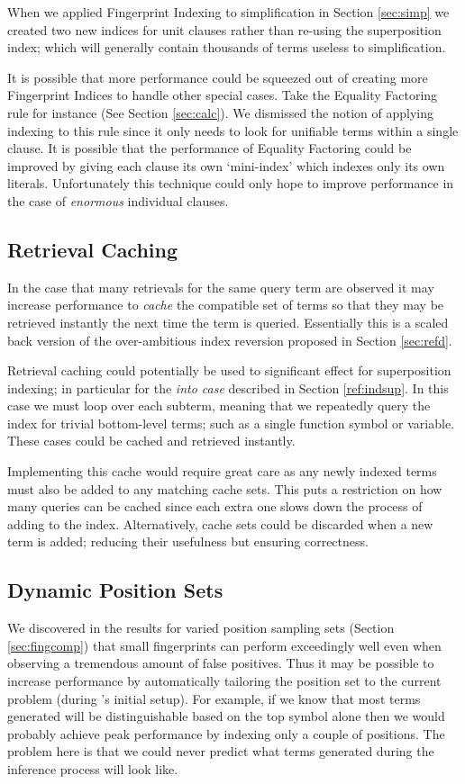 When we applied Fingerprint Indexing to simplification in Section \ref{sec:simp}
we created two new indices for unit clauses rather than re-using the superposition
index; which will generally contain thousands of terms useless to simplification.

It is possible that more performance could be squeezed out of creating more Fingerprint
Indices to handle other special cases. Take the Equality Factoring rule for instance
(See Section \ref{sec:calc}). We dismissed the notion of applying indexing to this rule
since it only needs to look for unifiable terms within a single clause. It is possible
that the performance of Equality Factoring could be improved by giving each clause
its own `mini-index' which indexes only its own literals. Unfortunately this technique
could only hope to improve performance in the case of \emph{enormous} individual clauses.

\subsection{Retrieval Caching}
In the case that many retrievals for the same query term are observed it may increase
performance to \emph{cache} the compatible set of terms so that they may be retrieved
instantly the next time the term is queried. Essentially this is a scaled back version
of the over-ambitious index reversion proposed in Section \ref{sec:refd}.

Retrieval caching could potentially be used to significant effect for superposition
indexing; in particular for the \emph{into case} described in Section \ref{ref:indsup}.
In this case we must loop over each subterm, meaning that we repeatedly query the index
for trivial bottom-level terms; such as a single function symbol or variable. These cases
could be cached and retrieved instantly.

Implementing this cache would require great care as any newly indexed terms must
also be added to any matching cache sets. This puts a restriction on how many queries
can be cached since each extra one slows down the process of adding to the index.
Alternatively, cache sets could be discarded when a new term is added; reducing their
usefulness but ensuring correctness.

\subsection{Dynamic Position Sets}
We discovered in the results for varied position sampling sets (Section \ref{sec:fingcomp}) that
small fingerprints can perform exceedingly well even when observing a tremendous
amount of false positives.
Thus it may be possible to increase performance by automatically tailoring the position
set to the current problem (during \beagle's initial setup). For example, if we know
that most terms generated will be distinguishable based on the top symbol alone
then we would probably achieve peak performance by indexing only a couple of positions.
The problem here is that we could never predict what terms generated during the inference process will look like.


